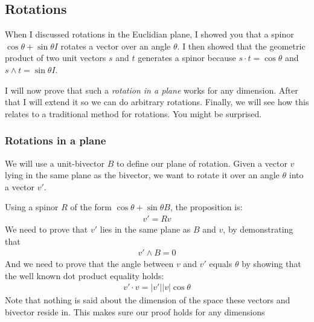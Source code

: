 \documentclass[10pt]{report}
\begin{document}
\subsection{Rotations}

When I discussed rotations in the Euclidian plane, I showed you
that a spinor $\cos \theta + \sin \theta I$ rotates a vector over
an angle $\theta$. I then showed that the geometric product of two
unit vectors $s$ and $t$ generates a spinor because $s\cdot t =
\cos \theta$ and $s\wedge t = \sin\theta I$.

I will now prove that such a \emph{rotation in a plane} works for
any dimension. After that I will extend it so we can do arbitrary
rotations. Finally, we will see how this relates to a traditional
method for rotations. You might be surprised.

\subsubsection{Rotations in a plane}

We will use a unit-bivector $B$ to define our plane of rotation.
Given a vector $v$ lying in the same plane as the bivector, we
want to rotate it over an angle $\theta$ into a vector $v'$.

Using a spinor $R$ of the form $\cos \theta + \sin \theta B$, the
proposition is:
\begin{align}
    v' = Rv
    \label{eq:dimension free rotation in a plane}
\end{align}
We need to prove that $v'$ lies in the same plane as $B$ and $v$,
by demonstrating that
\begin{align}
    v'\wedge B = 0
    \label{eq:dimension free rotation requirement 1}
\end{align}
And we need to prove that the angle between $v$ and $v'$ equals
$\theta$ by showing that the well known dot product equality
holds:
\begin{align}
    v'\cdot v = |v'||v| \cos \theta
    \label{eq:dimension free rotation requirement 2}
\end{align}
Note that nothing is said about the dimension of the space these
vectors and bivector reside in. This makes sure our proof holds
for any dimensions
\end{document}
